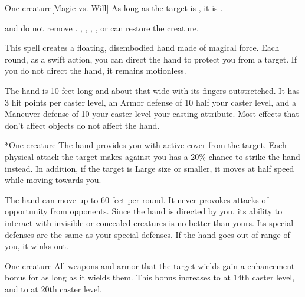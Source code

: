 \spellrng{\rngclose}
\begin{spelltarget}{One creature}[Magic vs. Will]
    \spellsuccess As long as the target is \bloodied, it is \confused.
\end{spelltarget}
\spellnotes {} and  do not remove . , , , , or  can restore the creature.

\spellrng{\rngmed}
\spelldur{\durshort \dismissable}
\spellline
\spelleffect This spell creates a floating, disembodied hand made of magical force. Each round, as a swift action, you can direct the hand to protect you from a target. If you do not direct the hand, it remains motionless.

The hand is 10 feet long and about that wide with its fingers outstretched. It has 3 hit points per caster level, an Armor defense of 10 \add half your caster level, and a Maneuver defense of 10 \add your caster level \add your casting attribute. Most effects that don't affect objects do not affect the hand.

\begin{spelltarget}*{One creature}
    \spelleffect The hand provides you with active cover from the target. Each physical attack the target makes against you has a 20\% chance to strike the hand instead. In addition, if the target is Large size or smaller, it moves at half speed while moving towards you.
\end{spelltarget}
\spellnotes The hand can move up to 60 feet per round. It never provokes attacks of opportunity from opponents. Since the hand is directed by you, its ability to interact with invisible or concealed creatures is no better than yours. Its special defenses are the same as your special defenses. If the hand goes out of range of you, it winks out.

\spellrng{\rngclose}
\spelldur{\durshort}
\begin{spelltarget}{One creature}
    \spelleffect All weapons and armor that the target wields gain a  enhancement bonus for as long as it wields them. This bonus increases to  at 14th caster level, and to  at 20th caster level.
\end{spelltarget}

